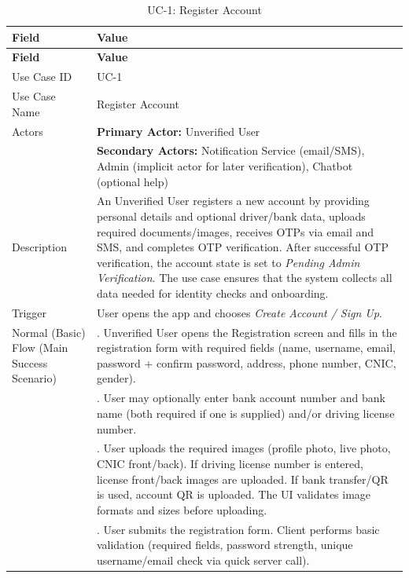\begin{longtable}{|>{\raggedright\arraybackslash}p{4cm}|>{\raggedright\arraybackslash}p{11cm}|}
\caption{UC-1: Register Account}
\label{tab:uc-1} \\
\hline
\rowcolor{lightgray!30}
\textbf{Field} & \textbf{Value} \\
\hline
\endfirsthead
\hline
\rowcolor{lightgray!30}
\textbf{Field} & \textbf{Value} \\
\hline
\endhead
\hline
\endfoot
\hline
\endlastfoot
Use Case ID & UC-1 \\
\hline
Use Case Name & Register Account \\
\hline
Actors & \textbf{Primary Actor:} Unverified User \\
& \textbf{Secondary Actors:} Notification Service (email/SMS), Admin (implicit actor for later verification), Chatbot (optional help) \\
\hline
Description & An Unverified User registers a new account by providing personal details and optional driver/bank data, uploads required documents/images, receives OTPs via email and SMS, and completes OTP verification. After successful OTP verification, the account state is set to \textit{Pending Admin Verification}. The use case ensures that the system collects all data needed for identity checks and onboarding. \\
\hline
Trigger & User opens the app and chooses \textit{Create Account / Sign Up}. \\
\hline
Normal (Basic) Flow (Main Success Scenario) & 1. Unverified User opens the Registration screen and fills in the registration form with required fields (name, username, email, password + confirm password, address, phone number, CNIC, gender). \\
& 2. User may optionally enter bank account number and bank name (both required if one is supplied) and/or driving license number. \\
& 3. User uploads the required images (profile photo, live photo, CNIC front/back). If driving license number is entered, license front/back images are uploaded. If bank transfer/QR is used, account QR is uploaded. The UI validates image formats and sizes before uploading. \\
& 4. User submits the registration form. Client performs basic validation (required fields, password strength, unique username/email check via quick server call). \\

\end{longtable}
